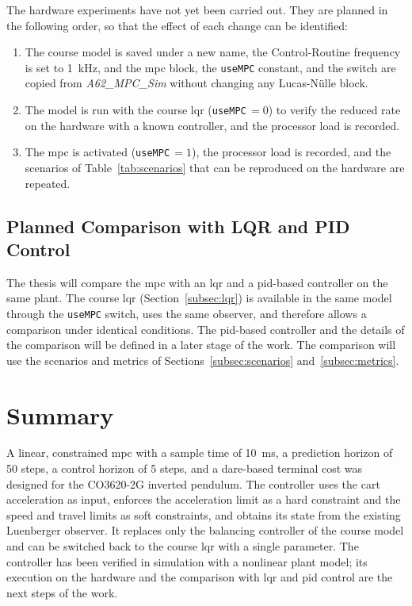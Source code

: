 The hardware experiments have not yet been carried out. They are planned in
the following order, so that the effect of each change can be identified:
\begin{enumerate}
  \item The course model is saved under a new name, the Control-Routine
        frequency is set to 1~kHz, and the \ac{mpc} block, the
        \texttt{useMPC} constant, and the switch are copied from
        \emph{A62\_MPC\_Sim} without changing any Lucas-Nülle block.
  \item The model is run with the course \ac{lqr} (\texttt{useMPC}$\,=0$) to
        verify the reduced rate on the hardware with a known controller, and
        the processor load is recorded.
  \item The \ac{mpc} is activated (\texttt{useMPC}$\,=1$), the processor load
        is recorded, and the scenarios of Table~\ref{tab:scenarios} that can be
        reproduced on the hardware are repeated.
\end{enumerate}

\subsection{Planned Comparison with LQR and PID Control}
\label{subsec:benchmark}

The thesis will compare the \ac{mpc} with an \ac{lqr} and a \ac{pid}-based
controller on the same plant. The course \ac{lqr}
(Section~\ref{subsec:lqr}) is available in the same model through the
\texttt{useMPC} switch, uses the same observer, and therefore allows a
comparison under identical conditions. The \ac{pid}-based controller and the
details of the comparison will be defined in a later stage of the work. The
comparison will use the scenarios and metrics of
Sections~\ref{subsec:scenarios} and~\ref{subsec:metrics}.

\section{Summary}
\label{sec:methodsummary}

A linear, constrained \ac{mpc} with a sample time of 10~ms, a prediction
horizon of 50 steps, a control horizon of 5 steps, and a \ac{dare}-based
terminal cost was designed for the CO3620-2G inverted pendulum. The controller
uses the cart acceleration as input, enforces the acceleration limit as a hard
constraint and the speed and travel limits as soft constraints, and obtains
its state from the existing Luenberger observer. It replaces only the
balancing controller of the course model and can be switched back to the
course \ac{lqr} with a single parameter. The controller has been verified in
simulation with a nonlinear plant model; its execution on the hardware and the
comparison with \ac{lqr} and \ac{pid} control are the next steps of the
work.

